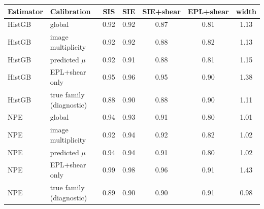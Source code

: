 \begin{tabular*}{\linewidth}{@{\extracolsep{\fill}}llccccc@{}}
\toprule
Estimator & Calibration & SIS & SIE & SIE+shear & EPL+shear & width \\
\midrule
HistGB & global & 0.92 & 0.92 & 0.87 & 0.81 & 1.13 \\
HistGB & image multiplicity & 0.92 & 0.92 & 0.88 & 0.82 & 1.13 \\
HistGB & predicted $\mu$ & 0.92 & 0.91 & 0.88 & 0.81 & 1.15 \\
HistGB & EPL+shear only & 0.95 & 0.96 & 0.95 & 0.90 & 1.38 \\
HistGB & true family (diagnostic) & 0.88 & 0.90 & 0.88 & 0.90 & 1.11 \\
\midrule
NPE & global & 0.94 & 0.93 & 0.91 & 0.80 & 1.01 \\
NPE & image multiplicity & 0.92 & 0.94 & 0.92 & 0.82 & 1.02 \\
NPE & predicted $\mu$ & 0.94 & 0.94 & 0.91 & 0.80 & 1.02 \\
NPE & EPL+shear only & 0.99 & 0.98 & 0.96 & 0.91 & 1.43 \\
NPE & true family (diagnostic) & 0.89 & 0.90 & 0.90 & 0.91 & 0.98 \\
\bottomrule
\end{tabular*}